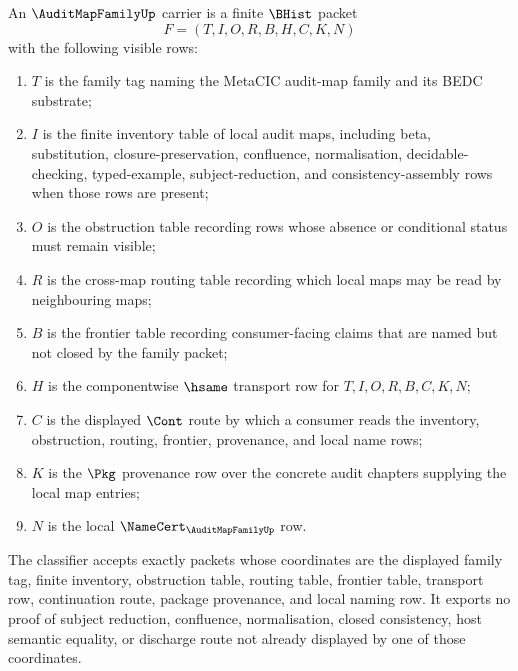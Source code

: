 \begin{definition}
\label{def:audit-map-family-namecert-carrier}
An $\AuditMapFamilyUp$ carrier is a finite $\BHist$ packet
$$
F=(T,I,O,R,B,H,C,K,N)
$$
with the following visible rows:
\begin{enumerate}
\item $T$ is the family tag naming the MetaCIC audit-map family and its BEDC substrate;
\item $I$ is the finite inventory table of local audit maps, including beta, substitution, closure-preservation, confluence, normalisation, decidable-checking, typed-example, subject-reduction, and consistency-assembly rows when those rows are present;
\item $O$ is the obstruction table recording rows whose absence or conditional status must remain visible;
\item $R$ is the cross-map routing table recording which local maps may be read by neighbouring maps;
\item $B$ is the frontier table recording consumer-facing claims that are named but not closed by the family packet;
\item $H$ is the componentwise $\hsame$ transport row for $T,I,O,R,B,C,K,N$;
\item $C$ is the displayed $\Cont$ route by which a consumer reads the inventory, obstruction, routing, frontier, provenance, and local name rows;
\item $K$ is the $\Pkg$ provenance row over the concrete audit chapters supplying the local map entries;
\item $N$ is the local $\NameCert_{\AuditMapFamilyUp}$ row.
\end{enumerate}
The classifier accepts exactly packets whose coordinates are the displayed family tag, finite inventory, obstruction table, routing table, frontier table, transport row, continuation route, package provenance, and local naming row. It exports no proof of subject reduction, confluence, normalisation, closed consistency, host semantic equality, or discharge route not already displayed by one of those coordinates.
\end{definition}

